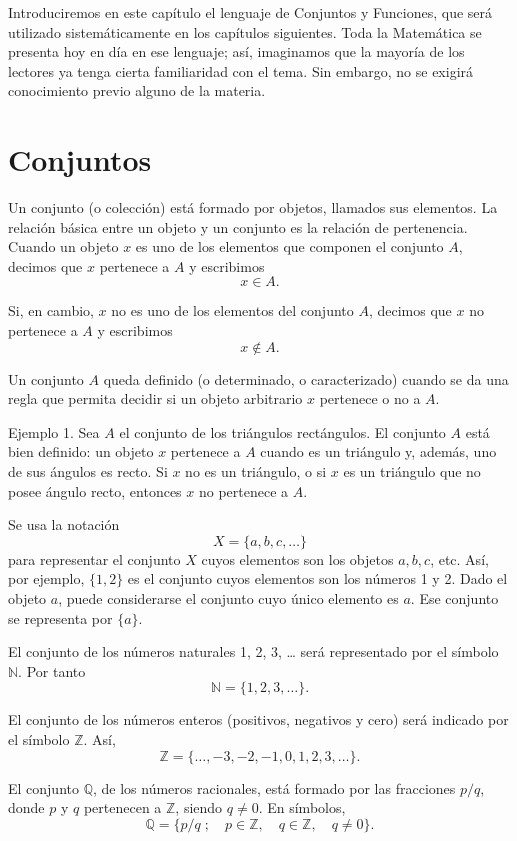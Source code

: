 \documentclass[12pt,oneside]{book}
\begin{document}
Introduciremos en este capítulo el lenguaje de Conjuntos y Funciones, que será utilizado sistemáticamente en los capítulos siguientes. Toda la Matemática se presenta hoy en día en ese lenguaje; así, imaginamos que la mayoría de los lectores ya tenga cierta familiaridad con el tema. Sin embargo, no se exigirá conocimiento previo alguno de la materia.

\section{Conjuntos}

Un conjunto (o colección) está formado por objetos, llamados sus elementos. La relación básica entre un objeto y un conjunto es la relación de pertenencia. Cuando un objeto \( x \) es uno de los elementos que componen el conjunto \( A \), decimos que \( x \) pertenece a \( A \) y escribimos
\[ x \in A. \]

Si, en cambio, \( x \) no es uno de los elementos del conjunto \( A \), decimos que \( x \) no pertenece a \( A \) y escribimos
\[ x \notin A. \]

Un conjunto \( A \) queda definido (o determinado, o caracterizado) cuando se da una regla que permita decidir si un objeto arbitrario \( x \) pertenece o no a \( A \).

Ejemplo 1. Sea \( A \) el conjunto de los triángulos rectángulos. El conjunto \( A \) está bien definido: un objeto \( x \) pertenece a \( A \) cuando es un triángulo y, además, uno de sus ángulos es recto. Si \( x \) no es un triángulo, o si \( x \) es un triángulo que no posee ángulo recto, entonces \( x \) no pertenece a \( A \).

Se usa la notación
\[ X = \{a, b, c, \ldots\} \]
para representar el conjunto \( X \) cuyos elementos son los objetos \( a, b, c \), etc. Así, por ejemplo, \( \{1, 2\} \) es el conjunto cuyos elementos son los números 1 y 2. Dado el objeto \( a \), puede considerarse el conjunto cuyo único elemento es \( a \). Ese conjunto se representa por \( \{a\} \).

El conjunto de los números naturales 1, 2, 3, … será representado por el símbolo \( \mathbb{N} \). Por tanto
\[ \mathbb{N} = \{1, 2, 3, \ldots\}. \]

El conjunto de los números enteros (positivos, negativos y cero) será indicado por el símbolo \( \mathbb{Z} \). Así,
\[ \mathbb{Z} = \{\ldots, -3, -2, -1, 0, 1, 2, 3, \ldots\}. \]

El conjunto \( \mathbb{Q} \), de los números racionales, está formado por las fracciones \( p/q \), donde \( p \) y \( q \) pertenecen a \( \mathbb{Z} \), siendo \( q \neq 0 \). En símbolos,
\[
\mathbb{Q} = \{p/q \; ; \quad p \in \mathbb{Z}, \quad q \in \mathbb{Z}, \quad q \neq 0\}.
\]
\end{document}
